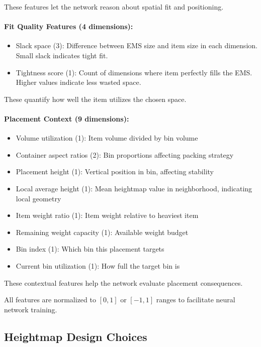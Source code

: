 These features let the network reason about spatial fit and positioning.

\paragraph{Fit Quality Features (4 dimensions):}
\begin{itemize}
    \item Slack space (3): Difference between EMS size and item size in each dimension. Small slack indicates tight fit.
    \item Tightness score (1): Count of dimensions where item perfectly fills the EMS. Higher values indicate less wasted space.
\end{itemize}

These quantify how well the item utilizes the chosen space.

\paragraph{Placement Context (9 dimensions):}
\begin{itemize}
    \item Volume utilization (1): Item volume divided by bin volume
    \item Container aspect ratios (2): Bin proportions affecting packing strategy
    \item Placement height (1): Vertical position in bin, affecting stability
    \item Local average height (1): Mean heightmap value in neighborhood, indicating local geometry
    \item Item weight ratio (1): Item weight relative to heaviest item
    \item Remaining weight capacity (1): Available weight budget
    \item Bin index (1): Which bin this placement targets
    \item Current bin utilization (1): How full the target bin is
\end{itemize}

These contextual features help the network evaluate placement consequences.

All features are normalized to $[0, 1]$ or $[-1, 1]$ ranges to facilitate neural network training.

\subsection{Heightmap Design Choices}

